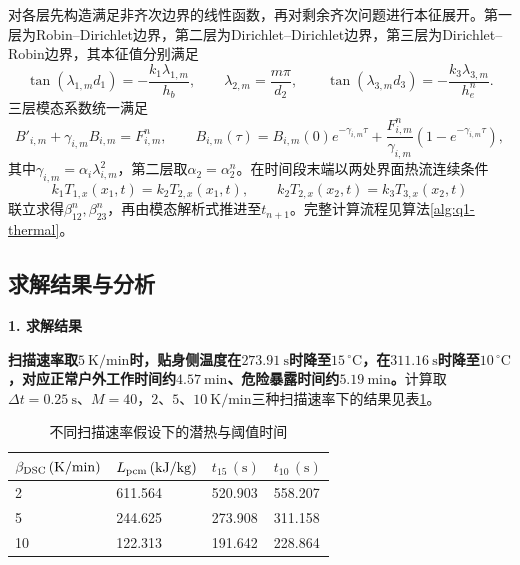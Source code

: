 对各层先构造满足非齐次边界的线性函数，再对剩余齐次问题进行本征展开。第一层为Robin--Dirichlet边界，第二层为Dirichlet--Dirichlet边界，第三层为Dirichlet--Robin边界，其本征值分别满足
\begin{equation}
\tan(\lambda_{1,m}d_1)=-\frac{k_1\lambda_{1,m}}{h_b},\qquad
\lambda_{2,m}=\frac{m\pi}{d_2},\qquad
\tan(\lambda_{3,m}d_3)=-\frac{k_3\lambda_{3,m}}{h_e^n}.
\label{eq:q1-eigen-summary}
\end{equation}
三层模态系数统一满足
\begin{equation}
B'_{i,m}+\gamma_{i,m}B_{i,m}=F_{i,m}^n,\qquad
B_{i,m}(\tau)=B_{i,m}(0)e^{-\gamma_{i,m}\tau}+\frac{F_{i,m}^n}{\gamma_{i,m}}\left(1-e^{-\gamma_{i,m}\tau}\right),
\label{eq:q1-mode-solution}
\end{equation}
其中$\gamma_{i,m}=\alpha_i\lambda_{i,m}^2$，第二层取$\alpha_2=\alpha_2^n$。在时间段末端以两处界面热流连续条件
\begin{equation}
k_1T_{1,x}(x_1,t)=k_2T_{2,x}(x_1,t),\qquad
k_2T_{2,x}(x_2,t)=k_3T_{3,x}(x_2,t)
\end{equation}
联立求得$\beta_{12}^n,\beta_{23}^n$，再由模态解析式推进至$t_{n+1}$。完整计算流程见算法\ref{alg:q1-thermal}。



\subsection{求解结果与分析}

\noindent\textbf{1. 求解结果}\par

\textbf{扫描速率取$5\ \mathrm{K/min}$时，贴身侧温度在$273.91\ \mathrm s$时降至$15\,^{\circ}\mathrm C$，在$311.16\ \mathrm s$时降至$10\,^{\circ}\mathrm C$，对应正常户外工作时间约$4.57\ \mathrm{min}$、危险暴露时间约$5.19\ \mathrm{min}$。}计算取$\Delta t=0.25\ \mathrm s$、$M=40$，$2$、$5$、$10\ \mathrm{K/min}$三种扫描速率下的结果见表\ref{tab:q1-time-result}。

\begin{table}[!htbp]
\centering
\caption{不同扫描速率假设下的潜热与阈值时间}
\label{tab:q1-time-result}
\begingroup
{}
\begin{tabularx}{\textwidth}{XXXX}  %
\toprule
\rowcolor{cyan!50!blue!30}
$\beta_{\rm DSC}\,(\mathrm{K/min})$ & $L_{\rm pcm}\,(\mathrm{kJ/kg})$ & $t_{15}\,(\mathrm{s})$ & $t_{10}\,(\mathrm{s})$ \\
\midrule
2 & 611.564 & 520.903 & 558.207 \\
5 & 244.625 & 273.908 & 311.158 \\
10 & 122.313 & 191.642 & 228.864 \\
\bottomrule
\end{tabularx}
\endgroup
\end{table}

